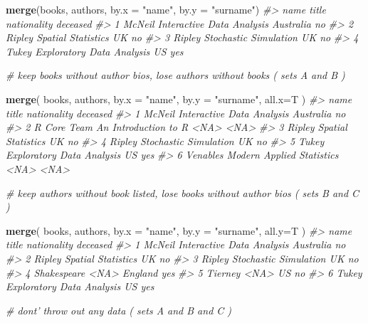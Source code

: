 \documentclass[]{book}
\newenvironment{Shaded}{\begin{snugshade}}{\end{snugshade}}
\newcommand{\CommentTok}[1]{\textcolor[rgb]{0.56,0.35,0.01}{\textit{#1}}}
\newcommand{\DataTypeTok}[1]{\textcolor[rgb]{0.13,0.29,0.53}{#1}}
\newcommand{\KeywordTok}[1]{\textcolor[rgb]{0.13,0.29,0.53}{\textbf{#1}}}
\newcommand{\NormalTok}[1]{#1}
\newcommand{\StringTok}[1]{\textcolor[rgb]{0.31,0.60,0.02}{#1}}
\theoremstyle{definition}
\theoremstyle{definition}
\theoremstyle{definition}
\theoremstyle{remark}
\begin{document}
\begin{Shaded}
\begin{Highlighting}[]
\KeywordTok{merge}\NormalTok{(books, authors, }\DataTypeTok{by.x =} \StringTok{"name"}\NormalTok{, }\DataTypeTok{by.y =} \StringTok{"surname"}\NormalTok{)    }
\CommentTok{#>     name                     title nationality deceased}
\CommentTok{#> 1 McNeil Interactive Data Analysis   Australia       no}
\CommentTok{#> 2 Ripley        Spatial Statistics          UK       no}
\CommentTok{#> 3 Ripley     Stochastic Simulation          UK       no}
\CommentTok{#> 4  Tukey Exploratory Data Analysis          US      yes}



\CommentTok{# keep books without author bios, lose authors without books  ( sets A and B )}

\KeywordTok{merge}\NormalTok{( books, authors, }\DataTypeTok{by.x =} \StringTok{"name"}\NormalTok{, }\DataTypeTok{by.y =} \StringTok{"surname"}\NormalTok{, }\DataTypeTok{all.x=}\NormalTok{T )     }
\CommentTok{#>          name                     title nationality deceased}
\CommentTok{#> 1      McNeil Interactive Data Analysis   Australia       no}
\CommentTok{#> 2 R Core Team      An Introduction to R        <NA>     <NA>}
\CommentTok{#> 3      Ripley        Spatial Statistics          UK       no}
\CommentTok{#> 4      Ripley     Stochastic Simulation          UK       no}
\CommentTok{#> 5       Tukey Exploratory Data Analysis          US      yes}
\CommentTok{#> 6    Venables Modern Applied Statistics        <NA>     <NA>}



\CommentTok{# keep authors without book listed, lose books without author bios   ( sets B and C )}

\KeywordTok{merge}\NormalTok{( books, authors, }\DataTypeTok{by.x =} \StringTok{"name"}\NormalTok{, }\DataTypeTok{by.y =} \StringTok{"surname"}\NormalTok{, }\DataTypeTok{all.y=}\NormalTok{T )    }
\CommentTok{#>          name                     title nationality deceased}
\CommentTok{#> 1      McNeil Interactive Data Analysis   Australia       no}
\CommentTok{#> 2      Ripley        Spatial Statistics          UK       no}
\CommentTok{#> 3      Ripley     Stochastic Simulation          UK       no}
\CommentTok{#> 4 Shakespeare                      <NA>     England      yes}
\CommentTok{#> 5     Tierney                      <NA>          US       no}
\CommentTok{#> 6       Tukey Exploratory Data Analysis          US      yes}



\CommentTok{# dont' throw out any data   ( sets A and B and C )}


\end{Highlighting}
\end{Shaded}
\end{document}
